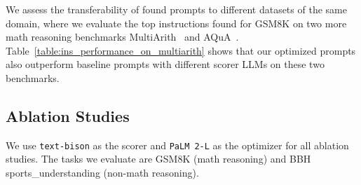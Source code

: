We assess the transferability of found prompts to different datasets of the same domain, where we evaluate the top instructions found for GSM8K on two more math reasoning benchmarks MultiArith~\citep{roy2016solving} and AQuA~\citep{ling2017program}.
Table~\ref{table:ins_performance_on_multiarith} shows that our optimized prompts also outperform baseline prompts with different scorer LLMs on these two benchmarks.

\subsection{Ablation Studies}
\label{sec:ablation}
We use \texttt{text-bison} as the scorer and \texttt{PaLM 2-L} as the optimizer for all ablation studies.
The tasks we evaluate are GSM8K (math reasoning) and BBH sports\_understanding (non-math reasoning).

